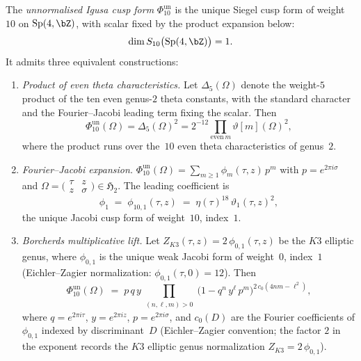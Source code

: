 \begin{definition}
\label{def:igusa-cusp-form}
The \emph{unnormalised Igusa cusp form} \(\Phi_{10}^{\mathrm{un}}\)
is the unique Siegel cusp form of weight~$10$ on
\(\operatorname{Sp}(4,\bZ)\), with scalar fixed by the product expansion
below:
\[
\dim S_{10}\bigl(\operatorname{Sp}(4,\bZ)\bigr) = 1.
\]
It admits three equivalent constructions:
\begin{enumerate}[label=\textup{(\roman*)}]
\item \emph{Product of even theta characteristics.}
Let $\Delta_5(\Omega)$ denote the weight-$5$ product of the ten even
genus-$2$ theta constants, with the standard character and the
Fourier--Jacobi leading term fixing the scalar. Then
\[
\Phi_{10}^{\mathrm{un}}(\Omega) = \Delta_5(\Omega)^2
= 2^{-12}\prod_{\text{even}\,m}\vartheta[m](\Omega)^2,
\]
where the product runs over the~$10$ even theta characteristics of
genus~$2$.
\item \emph{Fourier--Jacobi expansion.}
\(\Phi_{10}^{\mathrm{un}}(\Omega) = \sum_{m \geq 1}
\phi_m(\tau,z)\,p^m\) with $p = e^{2\pi i \sigma}$ and
$\Omega = \bigl(\begin{smallmatrix} \tau & z \\ z & \sigma
\end{smallmatrix}\bigr) \in \mathfrak{H}_2$.
The leading coefficient is
\begin{equation}\label{eq:phi-10-1}
\phi_1 \;=\; \phi_{10,1}(\tau,z)
\;=\; \eta(\tau)^{18}\,\vartheta_1(\tau,z)^2,
\end{equation}
the unique Jacobi cusp form of weight~$10$, index~$1$.
\item \emph{Borcherds multiplicative lift.}
Let $Z_{K3}(\tau,z) = 2\,\phi_{0,1}(\tau,z)$ be the
$K3$ elliptic genus, where $\phi_{0,1}$ is the unique
weak Jacobi form of weight~$0$, index~$1$ (Eichler--Zagier
normalization: $\phi_{0,1}(\tau,0) = 12$). Then
\begin{equation}\label{eq:borcherds-lift}
\Phi_{10}^{\mathrm{un}}(\Omega) \;=\; p\,q\,y \prod_{\substack{
(n,\ell,m) > 0}}
\bigl(1 - q^n\,y^\ell\,p^m\bigr)^{2\,c_0(4nm - \ell^2)},
\end{equation}
where $q = e^{2\pi i \tau}$, $y = e^{2\pi i z}$,
$p = e^{2\pi i \sigma}$, and $c_0(D)$ are the Fourier
coefficients of $\phi_{0,1}$ indexed by discriminant~$D$
\textup{(}Eichler--Zagier convention; the factor $2$
in the exponent records the $K3$ elliptic genus
normalization $Z_{K3} = 2\,\phi_{0,1}$\textup{)}.
\end{enumerate}
\end{definition}

